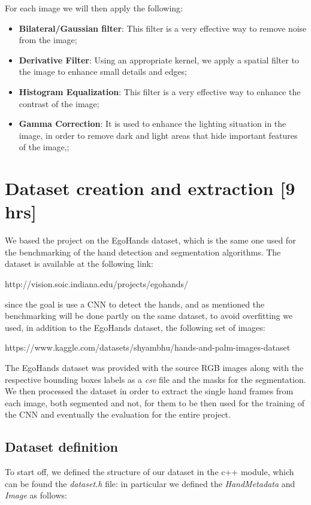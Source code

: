 For each image we will then apply the following:
\begin{itemize}
    \item \textbf{Bilateral/Gaussian filter}: This filter is a very effective way to remove noise from the image;
    \item \textbf{Derivative Filter}: Using an appropriate kernel, we apply a spatial filter to the image to enhance small details and edges;
    \item \textbf{Histogram Equalization}: This filter is a very effective way to enhance the contrast of the image;
    \item \textbf{Gamma Correction}: It is used to enhance the lighting situation in the image, in order to remove dark and light areas that hide important features of the image,;
\end{itemize}

\section{Dataset creation and extraction [9 hrs]}
We based the project on the EgoHands dataset, which is the same one used for the benchmarking of the hand detection and segmentation algorithms. The dataset is available at the following link:

http://vision.soic.indiana.edu/projects/egohands/

since the goal is use a CNN to detect the hands, and as mentioned the benchmarking will be done partly on the same dataset, to avoid overfitting we used, in addition to the EgoHands dataset, 
the following set of images:

https://www.kaggle.com/datasets/shyambhu/hands-and-palm-images-dataset

The EgoHands dataset was provided with the source RGB images along with the respective bounding boxes labels as a \textit{csv} file and the masks for the segmentation. We then processed 
the dataset in order to extract the single hand frames from each image, both segmented and not, for them to be then used for the training of the CNN and eventually the evaluation for the entire 
project. 


\subsection{Dataset definition}

To start off, we defined the structure of our dataset in the c++ module, which can be found the \textit{dataset.h} file: in particular we defined the \textit{HandMetadata} and \textit{Image}
as follows: 

